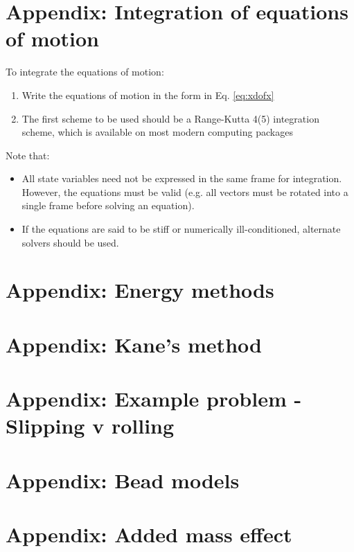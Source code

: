 \documentclass{article}
\begin{document}
\newpage
\section*{Appendix: Integration of equations of motion}
To integrate the equations of motion:
\begin{enumerate}
    \item Write the equations of motion in the form in Eq. \ref{eq:xdofx}
    \item The first scheme to be used should be a Range-Kutta 4(5) integration scheme, which is available on most modern computing packages
\end{enumerate}
Note that:
\begin{itemize}
    \item All state variables need not be expressed in the same frame for integration. However, the equations must be valid (e.g. all vectors must be rotated into a single frame before solving an equation). 
    \item If the equations are said to be stiff or numerically ill-conditioned, alternate solvers should be used. 
\end{itemize}




\newpage
\section*{Appendix: Energy methods}
\newpage
\section*{Appendix: Kane's method}
\newpage
\section*{Appendix: Example problem - Slipping v rolling}
\newpage
\section*{Appendix: Bead models}
\newpage
\section*{Appendix: Added mass effect}
\newpage
\end{document}
